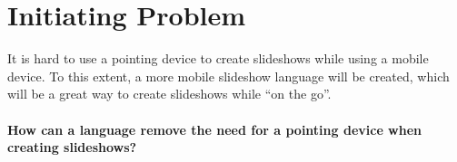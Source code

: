 \section{Initiating Problem}
It is hard to use a pointing device to create slideshows while using a mobile device. To this extent, a more mobile slideshow language will be created, which will be a great way to create slideshows while ``on the go''.
\\ \\
\textbf{How can a language remove the need for a pointing device when creating slideshows?}